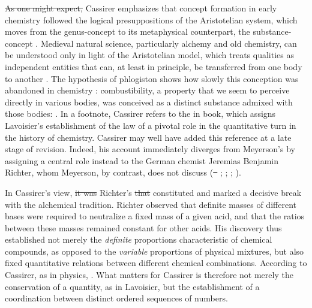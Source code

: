 \documentclass[submitted,12pt]{article}
\providecommand{\DIFadd}[1]{{\protect\color{blue}\uwave{#1}}} %
\providecommand{\DIFdel}[1]{{\protect\color{red}\sout{#1}}}                      %
\providecommand{\DIFaddbegin}{} %
\providecommand{\DIFaddend}{} %
\providecommand{\DIFdelbegin}{} %
\providecommand{\DIFdelend}{} %
\begin{document}
\DIFdelbegin \DIFdel{As one might expect, }\DIFdelend Cassirer emphasizes that concept formation in early chemistry followed the logical presuppositions of the Aristotelian system, which moves from the genus-concept  to its metaphysical counterpart, the substance-concept \origg{\SB}. Medieval natural science, particularly alchemy and old chemistry, can be understood only in light of the Aristotelian model, which treats qualities as independent entities that can, at least in principle, be transferred from one body to another . The hypothesis of phlogiston shows how slowly this conception was abandoned in chemistry : combustibility, a property that we seem to perceive directly in various bodies, was conceived as a distinct substance admixed with those bodies:  . In a footnote, Cassirer refers to the  in  book, which assigns Lavoisier's establishment of the law of  a pivotal role in the quantitative turn in the history of chemistry. Cassirer may well have added this reference at a late stage of revision. Indeed, his account immediately diverges from Meyerson's by assigning a central role instead to the German chemist Jeremias Benjamin Richter, whom Meyerson, by contrast, does not discuss (\DIFdelbegin \DIFdel{\mbox{%
\cite[see][III]{Duhem1902}}\hskip0pt%
}\DIFdelend \DIFaddbegin \DIFadd{\mbox{%
\cite[see][II.III]{Duhem1902}}\hskip0pt%
}\DIFaddend ; \cite[lect.~4]{Ladenburg1902}; \cite[I.I]{Wurtz1879}; \cite[44--49]{Ostwald1906Leitlinien}). 

In Cassirer's view, \DIFdelbegin \DIFdel{it was }\DIFdelend Richter's  \DIFdelbegin \DIFdel{that }\DIFdelend constituted   and marked a decisive break with the alchemical tradition. Richter observed that definite masses of different bases were required to neutralize a fixed mass of a given acid, and that the ratios between these masses remained constant for other acids. His discovery thus established not merely the \emph{definite} proportions characteristic of chemical compounds, as opposed to the \emph{variable} proportions of physical mixtures, but also fixed quantitative relations between different chemical combinations. According to Cassirer, as in physics,  . What matters for Cassirer is therefore not merely the conservation  of a quantity, as in Lavoisier, but the establishment of a coordination  between distinct ordered sequences of numbers.
\end{document}
